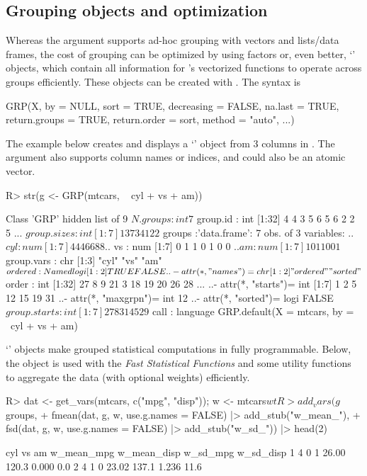 \documentclass[article]{jss}
\newcommand{\class}[1]{`\code{#1}'}
\begin{document}
\subsection{Grouping objects and optimization}
%
Whereas the  argument supports ad-hoc grouping with vectors and lists/data frames, the cost of grouping can be optimized by using factors or, even better, \class{GRP} objects, which contain all information for 's vectorized functions to operate across groups efficiently. These objects can be created with . The syntax is
 \begin{Code}
 GRP(X, by = NULL, sort = TRUE, decreasing = FALSE, na.last = TRUE,
     return.groups = TRUE, return.order = sort, method = "auto", ...)
 \end{Code}
 The example below creates and displays a \class{GRP} object from 3 columns in . The  argument also supports column names or indices, and  could also be an atomic vector.
%
\begin{Schunk}
\begin{Sinput}
R> str(g <- GRP(mtcars, ~ cyl + vs + am))
\end{Sinput}
\begin{Soutput}
Class 'GRP'  hidden list of 9
 $ N.groups    : int 7
 $ group.id    : int [1:32] 4 4 3 5 6 5 6 2 2 5 ...
 $ group.sizes : int [1:7] 1 3 7 3 4 12 2
 $ groups      :'data.frame':	7 obs. of  3 variables:
  ..$ cyl: num [1:7] 4 4 4 6 6 8 8
  ..$ vs : num [1:7] 0 1 1 0 1 0 0
  ..$ am : num [1:7] 1 0 1 1 0 0 1
 $ group.vars  : chr [1:3] "cyl" "vs" "am"
 $ ordered     : Named logi [1:2] TRUE FALSE
  ..- attr(*, "names")= chr [1:2] "ordered" "sorted"
 $ order       : int [1:32] 27 8 9 21 3 18 19 20 26 28 ...
  ..- attr(*, "starts")= int [1:7] 1 2 5 12 15 19 31
  ..- attr(*, "maxgrpn")= int 12
  ..- attr(*, "sorted")= logi FALSE
 $ group.starts: int [1:7] 27 8 3 1 4 5 29
 $ call        : language GRP.default(X = mtcars, by = ~cyl + vs + am)
\end{Soutput}
\end{Schunk}
%
\class{GRP} objects make grouped statistical computations in  fully programmable. Below, the object is used with the \emph{Fast Statistical Functions} and some utility functions to aggregate the data (with optional weights) efficiently.
%
\begin{Schunk}
\begin{Sinput}
R> dat <- get_vars(mtcars, c("mpg", "disp")); w <- mtcars$wt
R> add_vars(g$groups,
+    fmean(dat, g, w, use.g.names = FALSE) |> add_stub("w_mean_"),
+    fsd(dat, g, w, use.g.names = FALSE) |> add_stub("w_sd_")) |> head(2)
\end{Sinput}
\begin{Soutput}
  cyl vs am w_mean_mpg w_mean_disp w_sd_mpg w_sd_disp
1   4  0  1      26.00       120.3    0.000       0.0
2   4  1  0      23.02       137.1    1.236      11.6
\end{Soutput}
\end{Schunk}
\end{document}
